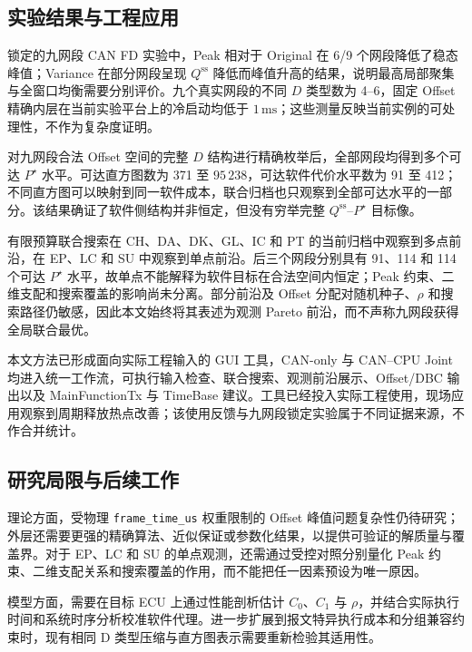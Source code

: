 \documentclass[UTF8,a4paper,twoside,zihao=-4]{ctexart}
\numberwithin{equation}{section}
\numberwithin{figure}{section}
\numberwithin{table}{section}
\theoremstyle{definition}
\numberwithin{algocf}{section}
\begin{document}
\subsection{实验结果与工程应用}
\label{subsec:conclusion-results}

锁定的九网段 CAN FD 实验中，Peak 相对于 Original 在 6/9 个网段降低了稳态峰值；Variance 在部分网段呈现 $Q^{\mathrm{ss}}$ 降低而峰值升高的结果，说明最高局部聚集与全窗口均衡需要分别评价。九个真实网段的不同 $D$ 类型数为 4--6，固定 Offset 精确内层在当前实验平台上的冷启动均低于 $1\,\mathrm{ms}$；这些测量反映当前实例的可处理性，不作为复杂度证明。

对九网段合法 Offset 空间的完整 $D$ 结构进行精确枚举后，全部网段均得到多个可达 $P^\star$ 水平。可达直方图数为 371 至 $95\,238$，可达软件代价水平数为 91 至 412；不同直方图可以映射到同一软件成本，联合归档也只观察到全部可达水平的一部分。该结果确证了软件侧结构并非恒定，但没有穷举完整 $Q^{\mathrm{ss}}$--$P^\star$ 目标像。

有限预算联合搜索在 CH、DA、DK、GL、IC 和 PT 的当前归档中观察到多点前沿，在 EP、LC 和 SU 中观察到单点前沿。后三个网段分别具有 91、114 和 114 个可达 $P^\star$ 水平，故单点不能解释为软件目标在合法空间内恒定；Peak 约束、二维支配和搜索覆盖的影响尚未分离。部分前沿及 Offset 分配对随机种子、$\rho$ 和搜索路径仍敏感，因此本文始终将其表述为观测 Pareto 前沿，而不声称九网段获得全局联合最优。

本文方法已形成面向实际工程输入的 GUI 工具，CAN-only 与 CAN--CPU Joint 均进入统一工作流，可执行输入检查、联合搜索、观测前沿展示、Offset/DBC 输出以及 MainFunctionTx 与 TimeBase 建议。工具已经投入实际工程使用，现场应用观察到周期释放热点改善；该使用反馈与九网段锁定实验属于不同证据来源，不作合并统计。

\subsection{研究局限与后续工作}
\label{subsec:conclusion-limitations}

理论方面，受物理 \texttt{frame\_time\_us} 权重限制的 Offset 峰值问题复杂性仍待研究；外层还需要更强的精确算法、近似保证或参数化结果，以提供可验证的解质量与覆盖界。对于 EP、LC 和 SU 的单点观测，还需通过受控对照分别量化 Peak 约束、二维支配关系和搜索覆盖的作用，而不能把任一因素预设为唯一原因。

模型方面，需要在目标 ECU 上通过性能剖析估计 $C_0$、$C_1$ 与 $\rho$，并结合实际执行时间和系统时序分析校准软件代理。进一步扩展到报文特异执行成本和分组兼容约束时，现有相同 D 类型压缩与直方图表示需要重新检验其适用性。
\end{document}
